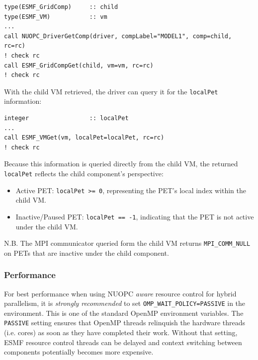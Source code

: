 \begin{verbatim}
type(ESMF_GridComp)     :: child
type(ESMF_VM)           :: vm
...
call NUOPC_DriverGetComp(driver, compLabel="MODEL1", comp=child, rc=rc)
! check rc
call ESMF_GridCompGet(child, vm=vm, rc=rc)
! check rc
\end{verbatim}

With the child VM retrieved, the driver can query it for the {\tt localPet} information:

\begin{verbatim}
integer                 :: localPet
...
call ESMF_VMGet(vm, localPet=localPet, rc=rc)
! check rc
\end{verbatim}

Because this information is queried directly from the child VM, the returned {\tt localPet} reflects the child component's perspective:

\begin{itemize}
\item Active PET: {\tt localPet >= 0}, representing the PET's local index within the child VM.

\item Inactive/Paused PET: {\tt localPet == -1}, indicating that the PET is not active under the child VM.
\end{itemize}

N.B. The MPI communicator queried form the child VM returns {\tt MPI\_COMM\_NULL} on PETs that are inactive under the child component.

\subsubsection{Performance}

For best performance when using NUOPC {\em aware} resource control for hybrid parallelism, it is {\em strongly recommended} to set {\tt OMP\_WAIT\_POLICY=PASSIVE} in the environment. This is one of the standard OpenMP environment variables. The {\tt PASSIVE} setting ensures that OpenMP threads relinquish the hardware threads (i.e. cores) as soon as they have completed their work. Without that setting, ESMF resource control threads can be delayed and context switching between components potentially becomes more expensive.
